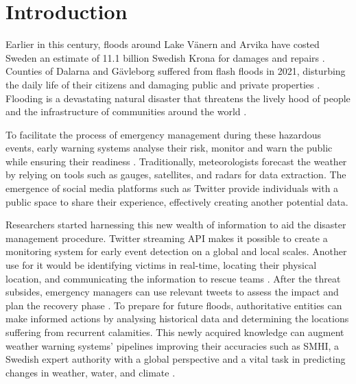 \chapter{Introduction}\label{sec:introduction}

Earlier in this century, floods around Lake Vänern and Arvika have costed Sweden an estimate of 11.1
billion Swedish Krona for damages and repairs \cite{RiverFloodsSweden2022}. Counties of Dalarna and
Gävleborg suffered from flash floods in 2021, disturbing the daily life of their citizens and
damaging public and private properties \cite{daviesSwedenFlashFloods2021}. Flooding is a devastating
natural disaster that threatens the lively hood of people and the infrastructure of communities
around the world \cite{Floodlist2021}.

To facilitate the process of emergency management during these hazardous events, early warning
systems analyse their risk, monitor and warn the public while ensuring their readiness
\cite{contributorsEarlyWarningSystem2022}. Traditionally, meteorologists forecast the weather by
relying on tools such as gauges, satellites, and radars for data extraction. The emergence of social
media platforms such as Twitter provide individuals with a public space to share their experience,
effectively creating another potential data.

Researchers started harnessing this new wealth of information to aid the disaster management
procedure. Twitter streaming \ac{API} makes it possible to create a monitoring system for early
event detection on a global \cite{debruijnGlobalDatabaseHistoric2019b} and local
\cite{barkerDevelopmentNationalscaleRealtime2019} scales. Another use for it would be identifying
victims in real-time, locating their physical location, and communicating the information to rescue
teams \cite{singhEventClassificationLocation2019}. After the threat subsides, emergency managers can
use relevant tweets to assess the impact and plan the recovery phase
\cite{barkerDevelopmentNationalscaleRealtime2019}. To prepare for future floods, authoritative
entities can make informed actions by analysing historical data and determining the locations
suffering from recurrent calamities. This newly acquired knowledge can augment weather warning
systems' pipelines improving their accuracies such as \ac{SMHI}, a Swedish expert authority with a
global perspective and a vital task in predicting changes in weather, water, and climate
\cite{SMHI2021}.

